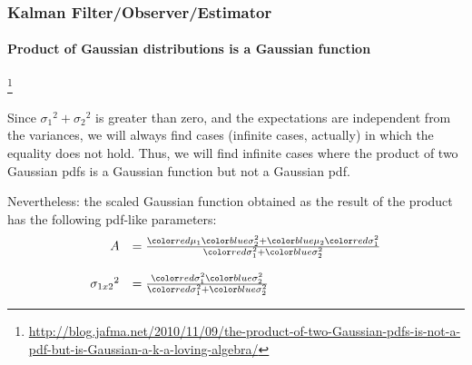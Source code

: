 \documentclass{beamer}
\newenvironment{changemargin}[2]
	{
	  	\begin{list}{}
		{
			\setlength{\topsep}{0pt}%
			\setlength{\leftmargin}{#1}%
			\setlength{\rightmargin}{#2}%
			\setlength{\listparindent}{\parindent}%
			\setlength{\itemindent}{\parindent}%
			\setlength{\parsep}{\parskip}%
		}
	  	\item[]
		}
		{\end{list}
	}
\begin{document}
\begin{frame}[plain]
\frametitle{Kalman Filter/Observer/Estimator}
\framesubtitle{Product of Gaussian distributions is a Gaussian function}

\footnote{\tiny\hspace{-0.23in} \hspace{-0.25in}
\href{http://blog.jafma.net/2010/11/09/the-product-of-two-Gaussian-pdfs-is-not-a-pdf-but-is-Gaussian-a-k-a-loving-algebra/}{http://blog.jafma.net/2010/11/09/the-product-of-two-Gaussian-pdfs-is-not-a-pdf-but-is-Gaussian-a-k-a-loving-algebra/}}
\begin{changemargin}{-1.35in}{0in}
\scriptsize
Since ${ {\sigma_{1}}^{2} + {\sigma_{2}}^{2} }$ is greater than zero, and the expectations are independent from the variances, we will always find cases (infinite cases, actually) in which the equality does not hold. Thus, we will find infinite cases where the product of two Gaussian pdfs is a Gaussian function but not a Gaussian pdf.

Nevertheless: the scaled Gaussian function obtained as the result of the product has the following pdf-like parameters:
\begin{equation*}
\begin{array}{rlllllll}
A &= \frac { \muone \vartwo + \mutwo \varone }{ \varone + \vartwo}\\\\
{\sigma_{1 x 2}}^2 &= \frac{\varone \vartwo}{\varone + \vartwo}
\end{array}
\end{equation*}
\end{changemargin}
\end{frame}








%
\end{document}
